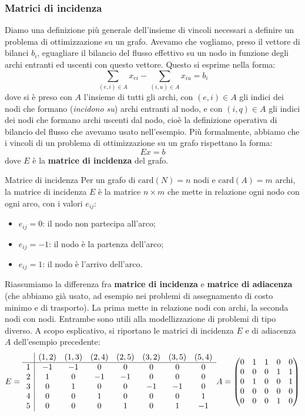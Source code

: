 \documentclass[a4paper,11pt]{article}
\begin{document}
\subsubsection{Matrici di incidenza}
Diamo una definizione più generale dell'insieme di vincoli necessari a definire un problema di ottimizzazione su un grafo.
Avevamo che vogliamo, preso il vettore di bilanci $b_i$, eguagliare il bilancio del flusso effettivo su un nodo in funzione degli archi entranti ed uscenti con questo vettore.
Questo si esprime nella forma:
$$
\sum_{(e, i) \in A} x_{ei} - \sum_{(i,u) \in A} x_{iu} = b_i
$$
dove si è preso con $A$ l'insieme di tutti gli archi, con $(e,i) \in A$ gli indici dei nodi che formano (\textit{incidono su}) archi entranti al nodo, e con $(i,q) \in A$ gli indici dei nodi che formano archi uscenti dal nodo, cioè la definizione operativa di bilancio del flusso che avevamo usato nell'esempio.
Più formalmente, abbiamo che i vincoli di un problema di ottimizzazione su un grafo rispettano la forma:
$$
E x = b 
$$
dove $E$ è la \textbf{matrice di incidenza} del grafo.
\begin{definition}{Matrice di incidenza}
	Per un grafo di $\mathrm{card}(N) = n$ nodi e $\mathrm{card}(A) = m$ archi, la matrice di incidenza $E$ è la matrice $n \times m$ che mette in relazione ogni nodo con ogni arco, con i valori $e_{ij}$:
\begin{itemize}
	\item $e_{ij} = 0$: il nodo non partecipa all'arco;
	\item $e_{ij} = -1$: il nodo è la partenza dell'arco;
	\item $e_{ij} = 1$: il nodo è l'arrivo dell'arco.
\end{itemize}
\end{definition}

Riassumiamo la differenza fra \textbf{matrice di incidenza} e \textbf{matrice di adiacenza} (che abbiamo già usato, ad esempio nei problemi di assegnamento di costo minimo e di trasporto).
La prima mette in relazione nodi con archi, la seconda nodi con nodi.
Entrambe sono utili alla modellizzazione di problemi di tipo diverso.
A scopo esplicativo, si riportano le matrici di incidenza $E$ e di adiacenza $A$ dell'esempio precedente:
$$
E =
\begin{array}{c | c c c c c c c}
	& (1, 2) & (1, 3) & (2, 4) & (2, 5) & (3, 2) & (3, 5) & (5, 4) \\ 
	\hline
	1 & -1 & -1 & 0 & 0 & 0 & 0 & 0 \\ 
	2 & 1 & 0 & -1 & -1 & 0 & 0 & 0 \\ 
	3 & 0 & 1 & 0 & 0 & -1 & -1 & 0 \\ 
	4 & 0 & 0 & 1 & 0 & 0 & 0 & 1 \\ 
	5 & 0 & 0 & 0 & 1 & 0 & 1 & -1
\end{array}
A = 
\begin{pmatrix}
	0 & 1 & 1 & 0 & 0 \\ 
	0 & 0 & 0 & 1 & 1 \\ 
	0 & 1 & 0 & 0 & 1 \\ 
	0 & 0 & 0 & 0 & 0 \\ 
	0 & 0 & 0 & 1 & 0
\end{pmatrix}
$$
 
\end{document}
